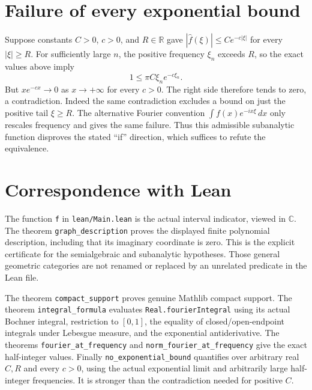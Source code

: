 \documentclass[11pt]{article}
\newcommand{\R}{\mathbb R}
\newcommand{\C}{\mathbb C}
\begin{document}
\section*{Failure of every exponential bound}
Suppose constants $C>0$, $c>0$, and $R\in\R$ gave
$|\widehat f(\xi)|\le Ce^{-c|\xi|}$ for every $|\xi|\ge R$.
For sufficiently large $n$, the positive frequency $\xi_n$ exceeds
$R$, so the exact values above imply
\[
 1\le\pi C\xi_n e^{-c\xi_n}.
\]
But $x e^{-cx}\to0$ as $x\to+\infty$ for every $c>0$.
The right side therefore tends to zero, a contradiction.
Indeed the same contradiction excludes a bound on just the positive
tail $\xi\ge R$. The alternative Fourier convention
$\int f(x)e^{-i x\xi}\,dx$ only rescales frequency and gives the
same failure. Thus this admissible subanalytic function disproves
the stated ``if'' direction, which suffices to refute the equivalence.

\section*{Correspondence with Lean}
The function \texttt{f} in \texttt{lean/Main.lean} is the actual
interval indicator, viewed in $\C$. The theorem
\texttt{graph\_\allowbreak{}description} proves the displayed finite polynomial
description, including that its imaginary coordinate is zero.
This is the explicit certificate for the semialgebraic and subanalytic
hypotheses. Those general geometric categories are not renamed or
replaced by an unrelated predicate in the Lean file.

The theorem \texttt{compact\_\allowbreak{}support} proves genuine Mathlib compact
support. The theorem \texttt{integral\_\allowbreak{}formula} evaluates
\texttt{Real.fourierIntegral} using its actual Bochner integral,
restriction to $[0,1]$, the equality of closed/open-endpoint integrals
under Lebesgue measure, and the exponential antiderivative.
The theorems \texttt{fourier\_\allowbreak{}at\_\allowbreak{}frequency} and
\texttt{norm\_\allowbreak{}fourier\_\allowbreak{}at\_\allowbreak{}frequency} give the exact half-integer
values. Finally \texttt{no\_\allowbreak{}exponential\_\allowbreak{}bound} quantifies over
arbitrary real $C,R$ and every $c>0$, using the actual exponential
limit and arbitrarily large half-integer frequencies. It is stronger
than the contradiction needed for positive $C$.
\end{document}
